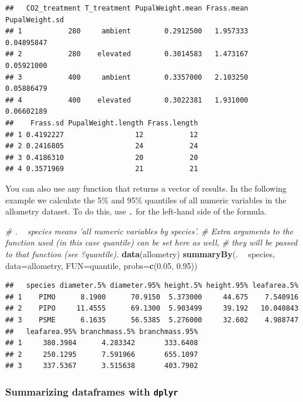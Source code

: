 \documentclass[]{book}
\newenvironment{Shaded}{\begin{snugshade}}{\end{snugshade}}
\newcommand{\CommentTok}[1]{\textcolor[rgb]{0.56,0.35,0.01}{\textit{#1}}}
\newcommand{\DataTypeTok}[1]{\textcolor[rgb]{0.13,0.29,0.53}{#1}}
\newcommand{\FloatTok}[1]{\textcolor[rgb]{0.00,0.00,0.81}{#1}}
\newcommand{\KeywordTok}[1]{\textcolor[rgb]{0.13,0.29,0.53}{\textbf{#1}}}
\newcommand{\NormalTok}[1]{#1}
\newcommand{\OperatorTok}[1]{\textcolor[rgb]{0.81,0.36,0.00}{\textbf{#1}}}
\newcommand{\StringTok}[1]{\textcolor[rgb]{0.31,0.60,0.02}{#1}}
\begin{document}
\begin{verbatim}
##   CO2_treatment T_treatment PupalWeight.mean Frass.mean PupalWeight.sd
## 1           280     ambient        0.2912500   1.957333     0.04895847
## 2           280    elevated        0.3014583   1.473167     0.05921000
## 3           400     ambient        0.3357000   2.103250     0.05886479
## 4           400    elevated        0.3022381   1.931000     0.06602189
##    Frass.sd PupalWeight.length Frass.length
## 1 0.4192227                 12           12
## 2 0.2416805                 24           24
## 3 0.4186310                 20           20
## 4 0.3571969                 21           21
\end{verbatim}

You can also use any function that returns a vector of results. In the following example we calculate the 5\% and 95\% quantiles of all numeric variables in the allometry dataset. To do this, use \texttt{.} for the left-hand side of the formula.

\begin{Shaded}
\begin{Highlighting}[]
\CommentTok{# . ~ species means 'all numeric variables by species'.}
\CommentTok{# Extra arguments to the function used (in this case quantile) can be set here as well,}
\CommentTok{# they will be passed to that function (see ?quantile).}
\KeywordTok{data}\NormalTok{(allometry)}
\KeywordTok{summaryBy}\NormalTok{(. }\OperatorTok{~}\StringTok{ }\NormalTok{species, }\DataTypeTok{data=}\NormalTok{allometry, }\DataTypeTok{FUN=}\NormalTok{quantile, }\DataTypeTok{probs=}\KeywordTok{c}\NormalTok{(}\FloatTok{0.05}\NormalTok{, }\FloatTok{0.95}\NormalTok{))}
\end{Highlighting}
\end{Shaded}

\begin{verbatim}
##   species diameter.5% diameter.95% height.5% height.95% leafarea.5%
## 1    PIMO      8.1900      70.9150  5.373000     44.675    7.540916
## 2    PIPO     11.4555      69.1300  5.903499     39.192   10.040843
## 3    PSME      6.1635      56.5385  5.276000     32.602    4.988747
##   leafarea.95% branchmass.5% branchmass.95%
## 1     380.3984      4.283342       333.6408
## 2     250.1295      7.591966       655.1097
## 3     337.5367      3.515638       403.7902
\end{verbatim}

\hypertarget{dplyr}{%
\subsubsection{\texorpdfstring{Summarizing dataframes with \texttt{dplyr}}{Summarizing dataframes with dplyr}}\label{dplyr}}
\end{document}
